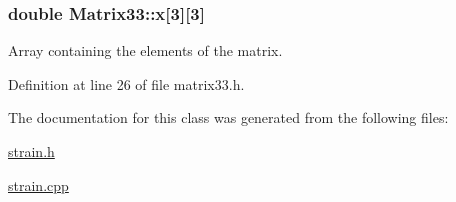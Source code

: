 \hypertarget{classMatrix33_af7f01fa466616eb7c8eda2e4d9f85cdd}{
\subsubsection[{x}]{\setlength{\rightskip}{0pt plus 5cm}double {\bf \-Matrix33\-::x}\mbox{[}3\mbox{]}\mbox{[}3\mbox{]}}}\label{de/d82/classMatrix33_af7f01fa466616eb7c8eda2e4d9f85cdd}


\-Array containing the elements of the matrix. 



\-Definition at line 26 of file matrix33.\-h.



\-The documentation for this class was generated from the following files\-:\begin{DoxyCompactItemize}
\item 
\hyperlink{strain_8h}{strain.\-h}\item 
\hyperlink{strain_8cpp}{strain.\-cpp}\end{DoxyCompactItemize}
